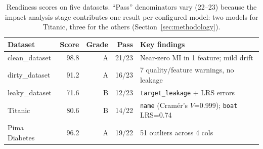 \documentclass[11pt]{article}
\begin{document}
\begin{table}[!h]
\centering
\caption{Readiness scores on five datasets. ``Pass'' denominators vary
  (22--23) because the impact-analysis stage contributes one result per
  configured model: two models for Titanic, three for the others
  (Section~\ref{sec:methodology}).}
\label{tab:readiness}
\scriptsize
\begin{tabularx}{\columnwidth}{lrrrX}
\toprule
\textbf{Dataset} & \textbf{Score} & \textbf{Grade} & \textbf{Pass} & \textbf{Key findings} \\
\midrule
clean\_dataset & 98.8 & A & 21/23 & Near-zero MI in 1 feature; mild drift \\
dirty\_dataset & 91.2 & A & 16/23 & 7 quality/feature warnings, no leakage \\
leaky\_dataset & 71.6 & B & 12/23 & \texttt{target\_leakage} + LRS errors \\
Titanic        & 80.6 & B & 14/22 & \texttt{name} (Cram\'er's $V$=0.999); \texttt{boat} LRS=0.74 \\
Pima Diabetes  & 96.2 & A & 19/22 & 51 outliers across 4 cols \\
\bottomrule
\end{tabularx}
\end{table}
\end{document}
